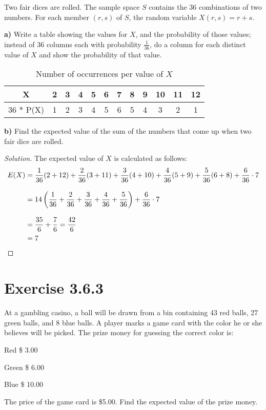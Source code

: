 \documentclass[titlepage, letterpaper, fleqn]{article}
\newcommand{\spacepls}{\vspace{5mm}}
\renewcommand\qedsymbol{\(\blacksquare\)}
\newenvironment{solution}
{\renewcommand\qedsymbol{$\square$}\begin{proof}[Solution]}
{\end{proof}}
\begin{document}
{\large Two fair dices are rolled.
The sample space \(S\) contains the 36 combinations of two numbers.
For each member \((r, s)\) of \(S\),
the random variable \(X(r,s) = r + s\).

\textbf{a)} Write a table showing the values for \(X\), and the probability of those values; instead of 36 columns each with probability \(\frac{1}{36}\),
do a column for each distinct value of \(X\) and show the probability of that value.}

\begin{table}[h!]
\centering
\begin{tabular}{@{}cccccccccccc@{}}
\toprule
X & 2 & 3 & 4 & 5 & 6 & 7 & 8 & 9 & 10 & 11 & 12 \\ \midrule
36 * P(X) & 1 & 2 & 3 & 4 & 5 & 6 & 5 & 4 & 3 & 2 & 1 \\ \bottomrule
\end{tabular}
\caption{Number of occurrences per value of \(X\)}
\label{tab01}
\end{table}

\spacepls

{\large \textbf{b)} Find the expected value of the sum of the numbers that come up when two fair dice are rolled.}

\begin{solution}
The expected value of \(X\) is calculated as follows:
\begin{align*}
E(X) & = \frac{1}{36}(2 + 12) + \frac{2}{36}(3 + 11) + \frac{3}{36}(4 + 10) + \frac{4}{36}(5 + 9) + \frac{5}{36}(6 + 8) + \frac{6}{36} \cdot 7 \\[2ex]
& = 14 \left( \frac{1}{36} + \frac{2}{36} + \frac{3}{36} + \frac{4}{36} + \frac{5}{36}\right) + \frac{6}{36} \cdot 7 \\[2ex]
& = \frac{35}{6} + \frac{7}{6} = \frac{42}{6}\\
& = 7 \qedhere
\end{align*}
\end{solution}

\section{Exercise 3.6.3}

{\large At a gambling casino, a ball will be drawn from a bin containing 43 red balls, 27 green balls, and 8 blue balls.
A player marks a game card with the color he or she believes will be picked.
The prize money for guessing the correct color is:

Red \$ 3.00

Green \$ 6.00

Blue \$ 10.00

The price of the game card is \$5.00.
Find the expected value of the prize money.}
\end{document}
